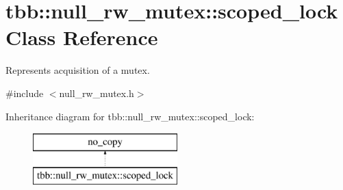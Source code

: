 \hypertarget{classtbb_1_1null__rw__mutex_1_1scoped__lock}{}\section{tbb\+:\+:null\+\_\+rw\+\_\+mutex\+:\+:scoped\+\_\+lock Class Reference}
\label{classtbb_1_1null__rw__mutex_1_1scoped__lock}


Represents acquisition of a mutex.  




{\ttfamily \#include $<$null\+\_\+rw\+\_\+mutex.\+h$>$}

Inheritance diagram for tbb\+:\+:null\+\_\+rw\+\_\+mutex\+:\+:scoped\+\_\+lock\+:\begin{figure}[H]
\begin{center}
\leavevmode
\includegraphics[height=2.000000cm]{classtbb_1_1null__rw__mutex_1_1scoped__lock}
\end{center}
\end{figure}

